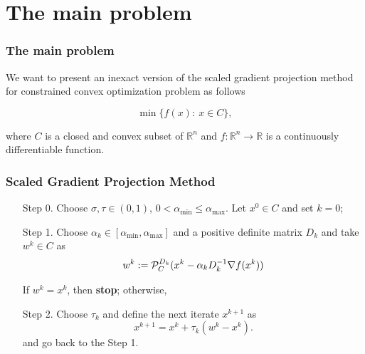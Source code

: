 \section{The main problem}


\begin{frame}
  \frametitle[c]{The main problem}

  We want to present an inexact version of the scaled gradient projection method  for  \textcolor{UFGred}{constrained convex optimization problem} as follows

  \bigskip

  \begin{equation} \label{eq:OptP}
    \min \{ f(x) :~   x\in C\},
  \end{equation}

  \bigskip

  where $C$ is a closed and convex subset of $\mathbb{R}^n$ and $f:\mathbb{R}^n \to \mathbb{R}$ is a continuously differentiable function.
\end{frame}


\begin{frame}
  \frametitle{Scaled Gradient Projection Method}

  \begin{enumerate}
    \item[Step 0.] Choose  $\sigma, \tau \in (0, 1)$, $0 < \alpha_{\min} \leq \alpha_{\max}$. Let $x^0\in C$ and set $k=0$;

    \item[Step 1.] Choose $\alpha_k\in [\alpha_{\min}, \alpha_{\max}]$ and a positive definite matrix $D_k$ and take  $w^{k}\in C$  as
      \begin{equation*}
        w^k := {\cal P}_{C}^{D_k} (x^{k}-\alpha_k D_k^{-1}\nabla f(x^{k}))
      \end{equation*}

      If $w^k= x^k$, then {\bf stop}; otherwise,
    \item [Step 2.] Choose $\tau_k$ and define the next iterate $x^{k+1}$ as
          \begin{equation} \label{eq:IterArm}
            x^{k+1} = x^{k} + \tau_k (w^k - x^{k}).
          \end{equation}
          and go back to the Step 1.
  \end{enumerate}
\end{frame}


